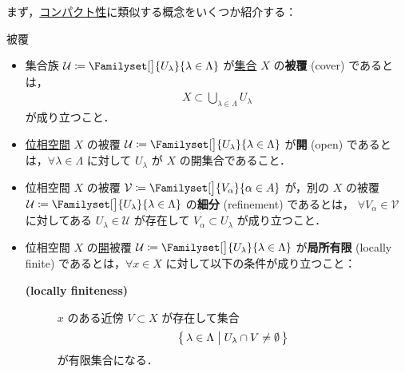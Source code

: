 \documentclass[geometry_main]{subfiles}
\begin{document}
まず，\hyperref[def.compact]{コンパクト性}に類似する概念をいくつか紹介する：
\begin{mydef}[label=def:cover, breakable]{被覆}
    \begin{itemize}
        \item 集合族 $\mathcal{U} \coloneqq \Familyset[\big]{U_\lambda}{\lambda \in \Lambda}$ が\underline{集合} $X$ の\textbf{被覆} (cover) であるとは，
        \begin{align}
            X \subset \bigcup_{\lambda \in \Lambda} U_\lambda
        \end{align}
        が成り立つこと．
        \item \underline{位相空間} $X$ の被覆 $\mathcal{U} \coloneqq \Familyset[\big]{U_\lambda}{\lambda \in \Lambda}$ が\textbf{開} (open) であるとは，$\forall \lambda \in \Lambda$ に対して $U_\lambda$ が $X$ の開集合であること．
        \item 位相空間 $X$ の被覆 $\mathcal{V} \coloneqq \Familyset[\big]{V_\alpha}{\alpha \in A}$ が，別の $X$ の被覆 $\mathcal{U} \coloneqq \Familyset[\big]{U_\lambda}{\lambda \in \Lambda}$ の\textbf{細分} (refinement) であるとは，
        $\forall V_\alpha \in \mathcal{V}$ に対してある $U_\lambda \in \mathcal{U}$ が存在して $V_\alpha \subset U_\lambda$ が成り立つこと．
        \item 位相空間 $X$ の\underline{開}被覆 $\mathcal{U} \coloneqq \Familyset[\big]{U_\lambda}{\lambda \in \Lambda}$ が\textbf{局所有限} (locally finite) であるとは，$\forall x \in X$ に対して以下の条件が成り立つこと：
        \begin{description}
            \item[\textbf{(locally finiteness)}] $x$ のある近傍 $V \subset X$ が存在して集合
            \begin{align}
                \bigl\{\, \lambda \in \Lambda \bigm| U_\lambda \cap V \neq \emptyset \,\bigr\} 
            \end{align}
            が有限集合になる．
        \end{description}
    \end{itemize}
\end{mydef}
\end{document}
